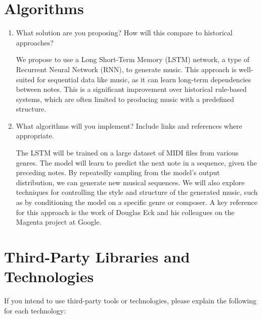\documentclass[]{article}
\begin{document}
\section{Algorithms}
\begin{enumerate}
    \item What solution are you proposing? How will this compare to historical approaches?

    We propose to use a Long Short-Term Memory (LSTM) network, a type of Recurrent Neural Network (RNN), to generate music. This approach is well-suited for sequential data like music, as it can learn long-term dependencies between notes. This is a significant improvement over historical rule-based systems, which are often limited to producing music with a predefined structure.

    \item What algorithms will you implement? Include links and references where appropriate.

    The LSTM will be trained on a large dataset of MIDI files from various genres. The model will learn to predict the next note in a sequence, given the preceding notes. By repeatedly sampling from the model's output distribution, we can generate new musical sequences. We will also explore techniques for controlling the style and structure of the generated music, such as by conditioning the model on a specific genre or composer. A key reference for this approach is the work of Douglas Eck and his colleagues on the Magenta project at Google.
\end{enumerate}

\section{Third-Party Libraries and Technologies}

If you intend to use third-party tools or technologies, please explain the following for each technology:
\end{document}
